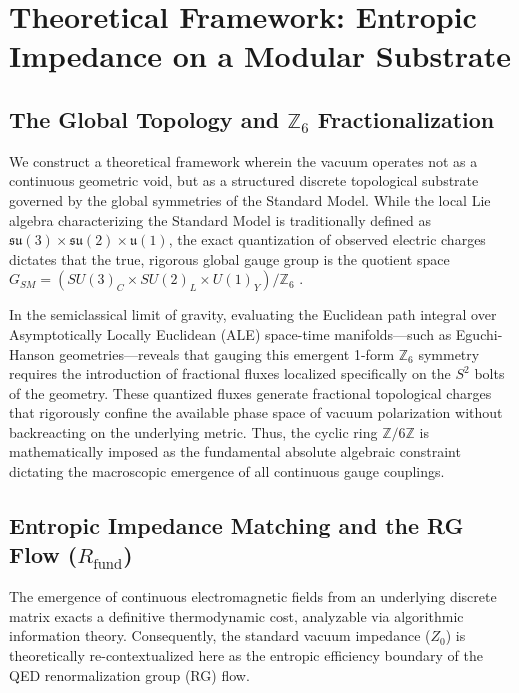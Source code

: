 \documentclass[12pt,a4paper]{article}
\begin{document}


\section{Theoretical Framework: Entropic Impedance on a Modular Substrate}

\subsection{The Global Topology and \texorpdfstring{$\mathbb{Z}_6$}{Z6} Fractionalization}

We construct a theoretical framework wherein the vacuum operates not as a continuous geometric void, but as a structured discrete topological substrate governed by the global symmetries of the Standard Model. While the local Lie algebra characterizing the Standard Model is traditionally defined as $\mathfrak{su}(3) \times \mathfrak{su}(2) \times \mathfrak{u}(1)$, the exact quantization of observed electric charges dictates that the true, rigorous global gauge group is the quotient space $G_{SM} = (SU(3)_C \times SU(2)_L \times U(1)_Y) / \mathbb{Z}_6$ \cite{aharony2013}. 

In the semiclassical limit of gravity, evaluating the Euclidean path integral over Asymptotically Locally Euclidean (ALE) space-time manifolds—such as Eguchi-Hanson geometries—reveals that gauging this emergent 1-form $\mathbb{Z}_6$ symmetry requires the introduction of fractional fluxes localized specifically on the $S^2$ bolts of the geometry. These quantized fluxes generate fractional topological charges that rigorously confine the available phase space of vacuum polarization without backreacting on the underlying metric. Thus, the cyclic ring $\mathbb{Z}/6\mathbb{Z}$ is mathematically imposed as the fundamental absolute algebraic constraint dictating the macroscopic emergence of all continuous gauge couplings.

\subsection{Entropic Impedance Matching and the RG Flow (\texorpdfstring{$R_{\text{fund}}$}{(R\_fund)})}

The emergence of continuous electromagnetic fields from an underlying discrete matrix exacts a definitive thermodynamic cost, analyzable via algorithmic information theory. Consequently, the standard vacuum impedance ($Z_0$) is theoretically re-contextualized here as the entropic efficiency boundary of the QED renormalization group (RG) flow. 
\end{document}
